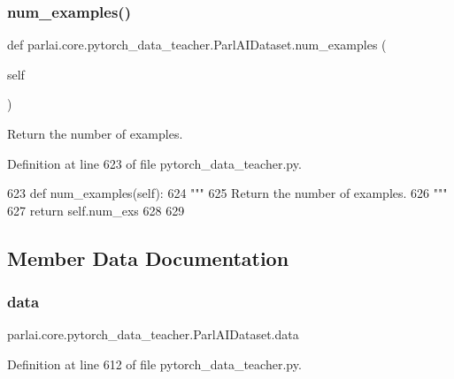 \subsubsection{\texorpdfstring{num\+\_\+examples()}{num\_examples()}}
{\footnotesize\ttfamily def parlai.\+core.\+pytorch\+\_\+data\+\_\+teacher.\+Parl\+A\+I\+Dataset.\+num\+\_\+examples (\begin{DoxyParamCaption}\item[{}]{self }\end{DoxyParamCaption})}

\begin{DoxyVerb}Return the number of examples.
\end{DoxyVerb}
 

Definition at line 623 of file pytorch\+\_\+data\+\_\+teacher.\+py.


\begin{DoxyCode}
623     \textcolor{keyword}{def }num\_examples(self):
624         \textcolor{stringliteral}{"""}
625 \textcolor{stringliteral}{        Return the number of examples.}
626 \textcolor{stringliteral}{        """}
627         \textcolor{keywordflow}{return} self.num\_exs
628 
629 
\end{DoxyCode}


\subsection{Member Data Documentation}
\mbox{\label{classparlai_1_1core_1_1pytorch__data__teacher_1_1ParlAIDataset_a0306ea2e7c88845945b1712391f45297}} 
\subsubsection{\texorpdfstring{data}{data}}
{\footnotesize\ttfamily parlai.\+core.\+pytorch\+\_\+data\+\_\+teacher.\+Parl\+A\+I\+Dataset.\+data}



Definition at line 612 of file pytorch\+\_\+data\+\_\+teacher.\+py.

\mbox{\label{classparlai_1_1core_1_1pytorch__data__teacher_1_1ParlAIDataset_acca9d3d351fc78077bfa4fe9acd49212}} 
